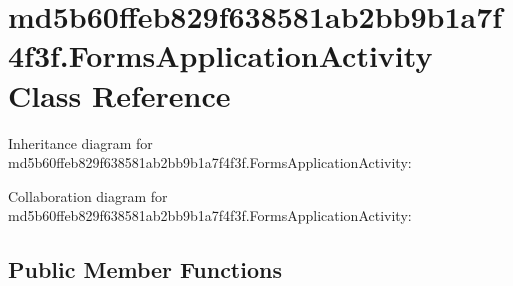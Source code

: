 \hypertarget{classmd5b60ffeb829f638581ab2bb9b1a7f4f3f_1_1_forms_application_activity}{}\section{md5b60ffeb829f638581ab2bb9b1a7f4f3f.\+Forms\+Application\+Activity Class Reference}
\label{classmd5b60ffeb829f638581ab2bb9b1a7f4f3f_1_1_forms_application_activity}


Inheritance diagram for md5b60ffeb829f638581ab2bb9b1a7f4f3f.\+Forms\+Application\+Activity\+:


Collaboration diagram for md5b60ffeb829f638581ab2bb9b1a7f4f3f.\+Forms\+Application\+Activity\+:
\subsection*{Public Member Functions}
